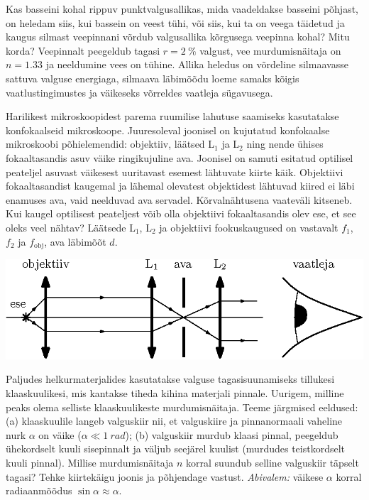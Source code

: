 \documentclass[10pt]{article}
\begin{document}
{%

Kas basseini kohal rippuv punktvalgusallikas, mida vaadeldakse basseini põhjast, on heledam siis, kui bassein on veest tühi, või siis, kui ta on veega täidetud ja kaugus silmast veepinnani võrdub valgusallika kõrgusega veepinna kohal? Mitu korda? Veepinnalt peegeldub tagasi $r = \SI{2}{\%}$ valgust, vee murdumisnäitaja on $n = \num{1,33}$ ja neeldumine vees on tühine. Allika heledus on võrdeline silmaavasse sattuva valguse energiaga, silmaava läbimõõdu loeme samaks kõigis vaatlustingimustes ja väikeseks võrreldes vaatleja sügavusega.
\probend
\bigskip


Harilikest mikroskoopidest parema ruumilise lahutuse saamiseks kasutatakse konfokaalseid
mikroskoope. Juuresoleval joonisel on kujutatud konfokaalse mikroskoobi põhielemendid:
objektiiv, läätsed L$_1$ ja L$_2$ ning nende ühises fokaaltasandis asuv väike ringikujuline ava.
Joonisel on samuti esitatud optilisel peateljel asuvast väikesest uuritavast esemest lähtuvate
kiirte käik.
Objektiivi fokaaltasandist kaugemal ja lähemal olevatest
objektidest lähtuvad kiired ei läbi enamuses ava, vaid neelduvad ava servadel.
Kõrvalnähtusena vaateväli kitseneb. Kui kaugel optilisest peateljest
võib olla objektiivi fokaaltasandis olev ese, et see oleks veel nähtav? Läätsede L$_1$, L$_2$ ja objektiivi fookuskaugused on vastavalt $f_1$, $f_2$ ja $f_{\mathrm{obj}}$, ava läbimõõt $d$.

\begin{center}
	\includegraphics[width=0.8\linewidth]{2009-v3g-07-G_konfokaalne_mikroskoop.eps}
\end{center}
\probend
\bigskip


Paljudes helkurmaterjalides kasutatakse valguse tagasisuunamiseks tillukesi
klaaskuulikesi, mis kantakse tiheda kihina materjali pinnale. Uurigem, milline
peaks olema selliste klaaskuulikeste murdumisnäitaja. Teeme järgmised eeldused:
(a) klaaskuulile langeb valguskiir nii, et valguskiire ja pinnanormaali vaheline
nurk $\alpha$ on väike ($\alpha \ll \SI{1}{rad}$); (b) valguskiir murdub klaasi
pinnal, peegeldub ühekordselt kuuli sisepinnalt ja väljub seejärel kuulist
(murdudes teistkordselt kuuli pinnal). Millise murdumisnäitaja $n$ korral
suundub selline valguskiir täpselt tagasi? Tehke kiirtekäigu joonis ja
põhjendage vastust. \emph{Abivalem:} väikese $\alpha$ korral radiaanmõõdus
$\sin\alpha \approx \alpha$.
\probend
\bigskip

}
\end{document}
